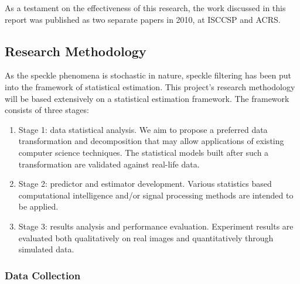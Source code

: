 As a testament on the effectiveness of this research, the work discussed in this report was published as two separate papers in 2010, at ISCCSP\cite{Le_2010_ISCCSP} and ACRS\cite{Le_2010_ACRS}.

\subsection{Research Methodology}

As the speckle phenomena is stochastic in nature, speckle filtering has been put into the framework of statistical estimation.
This project's research methodology will be based extensively on a statistical estimation framework. 
The framework consists of three stages:

\begin{enumerate}
\item Stage 1: data statistical analysis. 
We aim to propose a preferred data transformation and decomposition that may allow applications of existing computer science techniques. 
The statistical models built after such a transformation are validated against real-life data.
\item Stage 2: predictor and estimator development.
Various statistics based computational intelligence and/or signal processing methods are intended to be applied. 
\item Stage 3: results analysis and performance evaluation.
Experiment results are evaluated both qualitatively on real images and quantitatively through simulated data. 
\end{enumerate}

\subsubsection{Data Collection}

